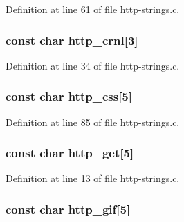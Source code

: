 Definition at line 61 of file http-\/strings.c.

\hypertarget{http-strings_8h_af2e1f75e5b640c00f89dd6d9598d08a2}{
\subsubsection[{http\_\-crnl}]{\setlength{\rightskip}{0pt plus 5cm}const char {\bf http\_\-crnl}\mbox{[}3\mbox{]}}}
\label{http-strings_8h_af2e1f75e5b640c00f89dd6d9598d08a2}


Definition at line 34 of file http-\/strings.c.

\hypertarget{http-strings_8h_ac0d021741ad67c52f199e8a22037ac8e}{
\subsubsection[{http\_\-css}]{\setlength{\rightskip}{0pt plus 5cm}const char {\bf http\_\-css}\mbox{[}5\mbox{]}}}
\label{http-strings_8h_ac0d021741ad67c52f199e8a22037ac8e}


Definition at line 85 of file http-\/strings.c.

\hypertarget{http-strings_8h_aeab14be7c9393694bc1d1e858cd0f512}{
\subsubsection[{http\_\-get}]{\setlength{\rightskip}{0pt plus 5cm}const char {\bf http\_\-get}\mbox{[}5\mbox{]}}}
\label{http-strings_8h_aeab14be7c9393694bc1d1e858cd0f512}


Definition at line 13 of file http-\/strings.c.

\hypertarget{http-strings_8h_a21f4d6b0759786044bce910d140df3b7}{
\subsubsection[{http\_\-gif}]{\setlength{\rightskip}{0pt plus 5cm}const char {\bf http\_\-gif}\mbox{[}5\mbox{]}}}
\label{http-strings_8h_a21f4d6b0759786044bce910d140df3b7}


